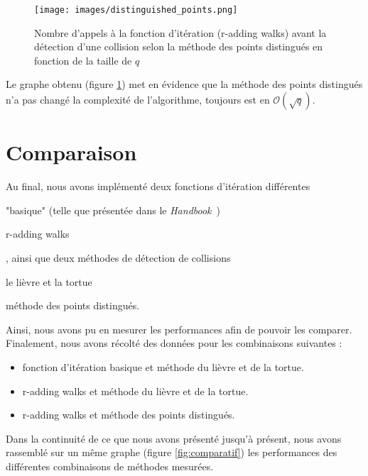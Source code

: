       \begin{figure}
        \center{}
        \texttt{[image: images/distinguished\_points.png]}
        \caption{Nombre d'appels à la fonction d'itération (r-adding walks) avant la détection d'une collision selon la méthode des points distingués en fonction de la taille de $q$}
        \label{fig:r_adding_walks_and_distinguished_points_results}
      \end{figure}

      Le graphe obtenu (figure \ref{fig:r_adding_walks_and_distinguished_points_results}) met en évidence que la méthode des points distingués n'a pas changé la complexité de l'algorithme, toujours est en $\mathcal{O}(\sqrt{q})$.


    \section{Comparaison}
    Au final, nous avons implémenté deux fonctions d'itération différentes
    \begin{enumerate*}
      \item "basique" (telle que présentée dans le \textit{Handbook}~\autocite[107]{handbook})
      \item r-adding walks
    \end{enumerate*}
    , ainsi que deux méthodes de détection de collisions
    \begin{enumerate*}
      \item le lièvre et la tortue
      \item méthode des points distingués.
    \end{enumerate*}

    Ainsi, nous avons pu en mesurer les performances afin de pouvoir les comparer. Finalement, nous avons récolté des données pour les combinaisons suivantes :

    \begin{itemize}
      \item fonction d'itération basique et méthode du lièvre et de la tortue.
      \item r-adding walks et méthode du lièvre et de la tortue.
      \item r-adding walks et méthode des points distingués.
    \end{itemize}

    Dans la continuité de ce que nous avons présenté jusqu'à présent, nous avons rassemblé sur un même graphe (figure \ref{fig:comparatif}) les performances des différentes combinaisons de méthodes mesurées.

